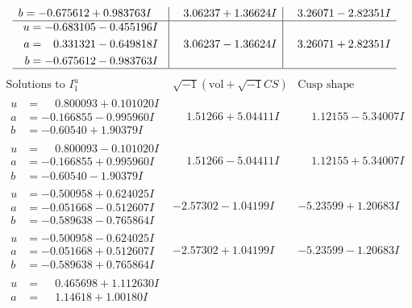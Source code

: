\documentclass[1p]{elsarticle_modified}
\theoremstyle{definition}
\newcommand{\I}{\sqrt{-1}}
\begin{document}
$$\begin{array}{c|c|c}
\begin{aligned}
b &= -0.675612 + 0.983763 I\end{aligned}
 & \phantom{-}3.06237 + 1.36624 I & \phantom{-}3.26071 - 2.82351 I \\ \hline\begin{aligned}
u &= -0.683105 - 0.455196 I \\
a &= \phantom{-}0.331321 - 0.649818 I \\
b &= -0.675612 - 0.983763 I\end{aligned}
 & \phantom{-}3.06237 - 1.36624 I & \phantom{-}3.26071 + 2.82351 I\\
 \hline 
 \end{array}$$\newpage$$\begin{array}{c|c|c}  
\text{Solutions to }I^u_{1}& \I (\text{vol} + \sqrt{-1}CS) & \text{Cusp shape}\\
 \hline 
\begin{aligned}
u &= \phantom{-}0.800093 + 0.101020 I \\
a &= -0.166855 - 0.995960 I \\
b &= -0.60540 + 1.90379 I\end{aligned}
 & \phantom{-}1.51266 + 5.04411 I & \phantom{-}1.12155 - 5.34007 I \\ \hline\begin{aligned}
u &= \phantom{-}0.800093 - 0.101020 I \\
a &= -0.166855 + 0.995960 I \\
b &= -0.60540 - 1.90379 I\end{aligned}
 & \phantom{-}1.51266 - 5.04411 I & \phantom{-}1.12155 + 5.34007 I \\ \hline\begin{aligned}
u &= -0.500958 + 0.624025 I \\
a &= -0.051668 - 0.512607 I \\
b &= -0.589638 - 0.765864 I\end{aligned}
 & -2.57302 - 1.04199 I & -5.23599 + 1.20683 I \\ \hline\begin{aligned}
u &= -0.500958 - 0.624025 I \\
a &= -0.051668 + 0.512607 I \\
b &= -0.589638 + 0.765864 I\end{aligned}
 & -2.57302 + 1.04199 I & -5.23599 - 1.20683 I \\ \hline\begin{aligned}
u &= \phantom{-}0.465698 + 1.112630 I \\
a &= \phantom{-}1.14618 + 1.00180 I \\

\end{aligned}
\end{array}$$
\end{document}
